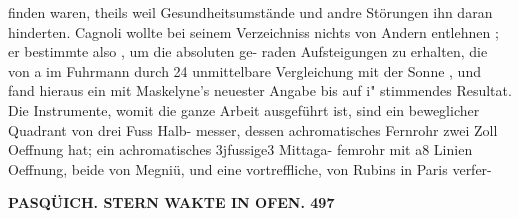 \documentclass[12pt,a4paper]{article}
\begin{document}
finden  waren,  theils  weil  Gesundheitsumstände  und  andre  Störungen  ihn  daran  hinderten.  Cagnoli wollte  bei  seinem  Verzeichniss  nichts  von  Andern  entlehnen ;  er  bestimmte  also ,  um  die  absoluten  ge- raden Aufsteigungen  zu  erhalten,  die  von  a  im  Fuhrmann  durch  24  unmittelbare  Vergleichung  mit  der Sonne ,  und  fand  hieraus  ein  mit  Maskelyne's  neuester  Angabe  bis  auf  i"  stimmendes  Resultat.  Die Instrumente,  womit  die  ganze  Arbeit  ausgeführt  ist,  sind  ein  beweglicher  Quadrant  von  drei  Fuss  Halb- messer, dessen  achromatisches  Fernrohr  zwei  Zoll  Oeffnung  hat;  ein  achromatisches  3jfussige3  Mittaga- femrohr  mit  a8  Linien  Oeffnung,  beide  von  Megniü,  und  eine  vortreffliche,  von  Rubins  in  Paris  verfer-

\vspace{0.5em}


\noindent\textbf{PASQÜICH.      STERN WAKTE  IN  OFEN.  497}
\end{document}
